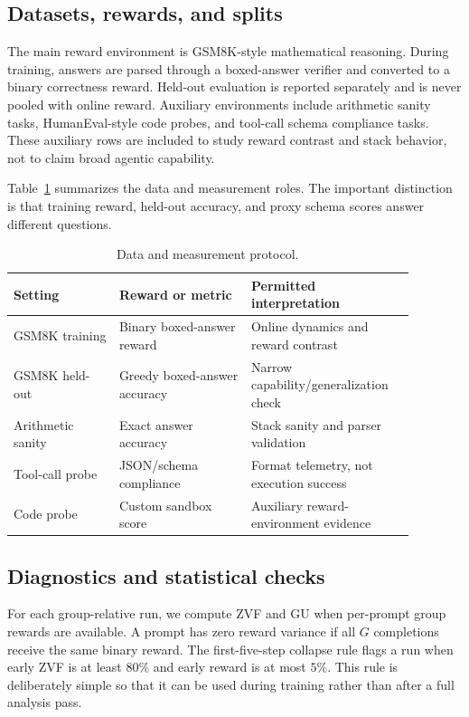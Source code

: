 \documentclass[runningheads,a4paper]{llncs}
\newcommand{\zvf}{\textsc{ZVF}}
\newcommand{\gu}{\textsc{GU}}
\begin{document}
\subsection{Datasets, rewards, and splits}

The main reward environment is GSM8K-style mathematical reasoning. During
training, answers are parsed through a boxed-answer verifier and converted to a
binary correctness reward. Held-out evaluation is reported separately and is
never pooled with online reward. Auxiliary environments include arithmetic
sanity tasks, HumanEval-style code probes, and tool-call schema compliance
tasks. These auxiliary rows are included to study reward contrast and stack
behavior, not to claim broad agentic capability.

Table~\ref{tab:data_protocol} summarizes the data and measurement roles. The
important distinction is that training reward, held-out accuracy, and proxy
schema scores answer different questions.

\begin{table}[t]
\centering
\caption{Data and measurement protocol.}
\label{tab:data_protocol}
\small
\begin{tabular}{p{0.24\linewidth}p{0.30\linewidth}p{0.34\linewidth}}
\toprule
\textbf{Setting} & \textbf{Reward or metric} & \textbf{Permitted interpretation} \\
\midrule
GSM8K training & Binary boxed-answer reward & Online dynamics and reward contrast \\
GSM8K held-out & Greedy boxed-answer accuracy & Narrow capability/generalization check \\
Arithmetic sanity & Exact answer accuracy & Stack sanity and parser validation \\
Tool-call probe & JSON/schema compliance & Format telemetry, not execution success \\
Code probe & Custom sandbox score & Auxiliary reward-environment evidence \\
\bottomrule
\end{tabular}
\end{table}

\subsection{Diagnostics and statistical checks}

For each group-relative run, we compute \zvf{} and \gu{} when per-prompt group
rewards are available. A prompt has zero reward variance if all $G$ completions
receive the same binary reward. The first-five-step collapse rule flags a run
when early \zvf{} is at least $80\%$ and early reward is at most $5\%$.
This rule is deliberately simple so that it can be used during training rather
than after a full analysis pass.
\end{document}
